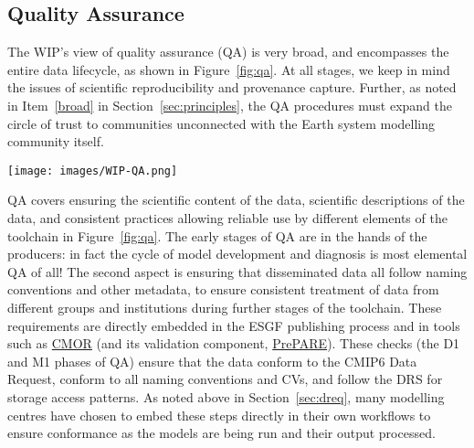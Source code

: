\documentclass[gmd,manuscript]{copernicus}
\newcommand{\figref}[1] {\mbox{Figure   \ref{fig:#1}}}
\newcommand{\secref}[1] {\mbox{Section  \ref{sec:#1}}}
\begin{document}
\subsection{Quality Assurance}
\label{sec:qa}

The WIP's view of quality assurance (QA) is very broad, and
encompasses the entire data lifecycle, as shown in \figref{qa}. At all
stages, we keep in mind the issues of scientific reproducibility and
provenance capture. Further, as noted in Item~\ref{broad} in
\secref{principles}, the QA procedures must expand the circle of trust
to communities unconnected with the Earth system modelling community
itself.

\begin{figure*}
  \begin{center}
    \texttt{[image: images/WIP-QA.png]}
  \end{center}
  \caption{Schematic of the phases of quality assurance, with earlier
    stages in the hands of modelling centres (left), and more formal
    long-term data curation stages at right. Quality assurance is
    applied both to the data (D, above) as well as the metadata (M)
    describing the data. Figure courtesy Martina Stockhause, drawn
    from the WIP's Quality Assurance position paper.}
  \label{fig:qa}
\end{figure*}

QA covers ensuring the scientific content of the data, scientific
descriptions of the data, and consistent practices allowing reliable
use by different elements of the toolchain in \figref{qa}. The early
stages of QA are in the hands of the producers: in fact the cycle of
model development and diagnosis is most elemental QA of all! The
second aspect is ensuring that disseminated data all follow naming
conventions and other metadata, to ensure consistent treatment of data
from different groups and institutions during further stages of the
toolchain. These requirements are directly embedded in the ESGF
publishing process and in tools such as
\href{https://cmor.llnl.gov/}{CMOR} (and its validation component,
\href{https://goo.gl/ApvMJx}{PrePARE}). These checks (the D1 and M1 
phases of QA) ensure that the data conform to the CMIP6 Data Request, 
conform to all naming conventions and CVs, and follow the DRS for 
storage access patterns. As noted above in \secref{dreq}, many 
modelling centres have chosen to embed these steps directly in their 
own workflows to ensure conformance as the models are being run and 
their output processed.
\end{document}
